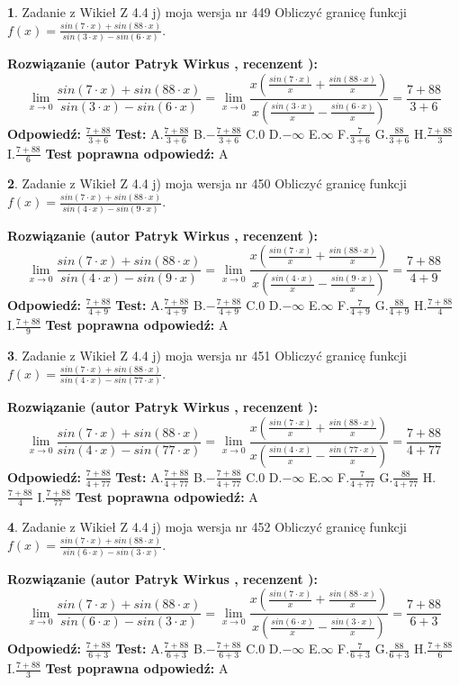 \documentclass[12pt, a4paper]{article}
\theoremstyle{definition} %
\newtheorem{zad}{}
\newcommand{\zadStart}[1]{\begin{zad}#1\newline}
\newcommand{\zadStop}{\end{zad}}
\newcommand{\rozwStart}[2]{\noindent \textbf{Rozwiązanie (autor #1 , recenzent #2): }\newline}
\newcommand{\rozwStop}{\newline}
\newcommand{\odpStart}{\noindent \textbf{Odpowiedź:}\newline}
\newcommand{\odpStop}{\newline}
\newcommand{\testStart}{\noindent \textbf{Test:}\newline}
\newcommand{\testStop}{\newline}
\newcommand{\kluczStart}{\noindent \textbf{Test poprawna odpowiedź:}\newline}
\newcommand{\kluczStop}{\newline}
\begin{document}
\zadStart{Zadanie z Wikieł Z 4.4 j) moja wersja nr 449}
Obliczyć granicę funkcji $f(x)=\frac{sin(7\cdot x) +sin(88\cdot x)}{sin(3\cdot x) -sin(6\cdot x)}$.
\zadStop
\rozwStart{Patryk Wirkus}{}
$$\lim\limits_{x\to 0}\frac{sin(7\cdot x) +sin(88\cdot x)}{sin(3\cdot x) -sin(6\cdot x)}=\lim\limits_{x\to 0}\frac{x(\frac{sin(7\cdot x)}{x}+\frac{sin(88\cdot x)}{x})}{x(\frac{sin(3\cdot x)}{x}-\frac{sin(6\cdot x)}{x})}=\frac{7+88}{3+6}$$
\rozwStop
\odpStart
$\frac{7+88}{3+6}$
\odpStop
\testStart
A.$\frac{7+88}{3+6}$
B.$-\frac{7+88}{3+6}$
C.$0$
D.$-\infty$
E.$\infty$
F.$\frac{7}{3+6}$
G.$\frac{88}{3+6}$
H.$\frac{7+88}{3}$
I.$\frac{7+88}{6}$
\testStop
\kluczStart
A
\kluczStop



\zadStart{Zadanie z Wikieł Z 4.4 j) moja wersja nr 450}
Obliczyć granicę funkcji $f(x)=\frac{sin(7\cdot x) +sin(88\cdot x)}{sin(4\cdot x) -sin(9\cdot x)}$.
\zadStop
\rozwStart{Patryk Wirkus}{}
$$\lim\limits_{x\to 0}\frac{sin(7\cdot x) +sin(88\cdot x)}{sin(4\cdot x) -sin(9\cdot x)}=\lim\limits_{x\to 0}\frac{x(\frac{sin(7\cdot x)}{x}+\frac{sin(88\cdot x)}{x})}{x(\frac{sin(4\cdot x)}{x}-\frac{sin(9\cdot x)}{x})}=\frac{7+88}{4+9}$$
\rozwStop
\odpStart
$\frac{7+88}{4+9}$
\odpStop
\testStart
A.$\frac{7+88}{4+9}$
B.$-\frac{7+88}{4+9}$
C.$0$
D.$-\infty$
E.$\infty$
F.$\frac{7}{4+9}$
G.$\frac{88}{4+9}$
H.$\frac{7+88}{4}$
I.$\frac{7+88}{9}$
\testStop
\kluczStart
A
\kluczStop



\zadStart{Zadanie z Wikieł Z 4.4 j) moja wersja nr 451}
Obliczyć granicę funkcji $f(x)=\frac{sin(7\cdot x) +sin(88\cdot x)}{sin(4\cdot x) -sin(77\cdot x)}$.
\zadStop
\rozwStart{Patryk Wirkus}{}
$$\lim\limits_{x\to 0}\frac{sin(7\cdot x) +sin(88\cdot x)}{sin(4\cdot x) -sin(77\cdot x)}=\lim\limits_{x\to 0}\frac{x(\frac{sin(7\cdot x)}{x}+\frac{sin(88\cdot x)}{x})}{x(\frac{sin(4\cdot x)}{x}-\frac{sin(77\cdot x)}{x})}=\frac{7+88}{4+77}$$
\rozwStop
\odpStart
$\frac{7+88}{4+77}$
\odpStop
\testStart
A.$\frac{7+88}{4+77}$
B.$-\frac{7+88}{4+77}$
C.$0$
D.$-\infty$
E.$\infty$
F.$\frac{7}{4+77}$
G.$\frac{88}{4+77}$
H.$\frac{7+88}{4}$
I.$\frac{7+88}{77}$
\testStop
\kluczStart
A
\kluczStop



\zadStart{Zadanie z Wikieł Z 4.4 j) moja wersja nr 452}
Obliczyć granicę funkcji $f(x)=\frac{sin(7\cdot x) +sin(88\cdot x)}{sin(6\cdot x) -sin(3\cdot x)}$.
\zadStop
\rozwStart{Patryk Wirkus}{}
$$\lim\limits_{x\to 0}\frac{sin(7\cdot x) +sin(88\cdot x)}{sin(6\cdot x) -sin(3\cdot x)}=\lim\limits_{x\to 0}\frac{x(\frac{sin(7\cdot x)}{x}+\frac{sin(88\cdot x)}{x})}{x(\frac{sin(6\cdot x)}{x}-\frac{sin(3\cdot x)}{x})}=\frac{7+88}{6+3}$$
\rozwStop
\odpStart
$\frac{7+88}{6+3}$
\odpStop
\testStart
A.$\frac{7+88}{6+3}$
B.$-\frac{7+88}{6+3}$
C.$0$
D.$-\infty$
E.$\infty$
F.$\frac{7}{6+3}$
G.$\frac{88}{6+3}$
H.$\frac{7+88}{6}$
I.$\frac{7+88}{3}$
\testStop
\kluczStart
A
\kluczStop
\end{document}
